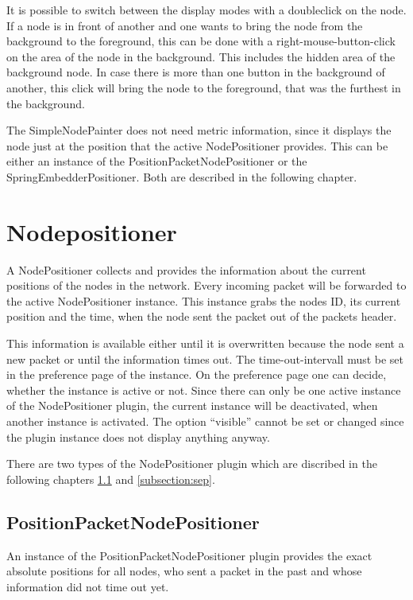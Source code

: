 It is possible to switch between the display modes with a doubleclick on the node. If a node is in front of another and one
wants to bring the node from the background to the foreground, this can be done with a right-mouse-button-click on
the area of the node in the background. This includes the hidden area of the background node.
In case there is more than one button in the background of another, this click will
bring the node to the foreground, that was the furthest in the background.

The SimpleNodePainter does not need metric information, since it displays the node just at the position that the active
NodePositioner provides. This can be either an instance of the PositionPacketNodePositioner or the SpringEmbedderPositioner.
Both are described in the following chapter.

\newpage
\section{Nodepositioner}

A NodePositioner collects and provides the information about the current positions of the nodes in the network. Every incoming
packet will be forwarded to the active NodePositioner instance. This instance grabs the nodes ID, its current position and
the time, when the node sent the packet out of the packets header.

This information is available either until it is overwritten
because the node sent a new packet or until the information times out. The time-out-intervall must be set in the preference page
of the instance. On the preference page one can decide, whether the instance is active or not. Since there can only be one
active instance of the NodePositioner plugin, the current instance will be deactivated, when another instance is activated.
The option ``visible'' cannot be set or changed since the plugin instance does not display anything anyway.

There are two types of the NodePositioner plugin which are discribed in the following chapters \ref{subsection:ppnp} and
\ref{subsection:sep}.

\subsection{PositionPacketNodePositioner}
\label{subsection:ppnp}

An instance of the PositionPacketNodePositioner plugin provides the exact absolute positions for all nodes, who sent
a packet in the past and whose information did not time out yet. 


